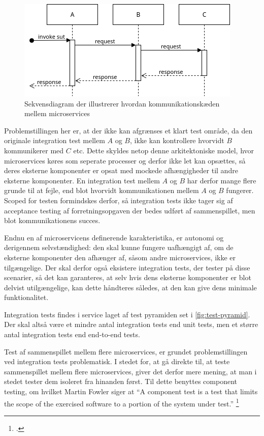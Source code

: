 \documentclass{article}
\begin{document}
\begin{figure}[H]
    \includegraphics[width=\textwidth]{images/microservice-request-chain.png}
    \caption{Sekvensdiagram der illustrerer hvordan kommunikationskæden mellem microservices}
    \label{fig:microservice-request-chain}
\end{figure}

Problemstillingen her er, at der ikke kan afgrænses et klart test område, da den originale integration test mellem $A$ og $B$, ikke kan kontrollere hvorvidt $B$ kommunikerer med $C$ etc. Dette skyldes netop denne arkitektoniske model, hvor microservices køres som seperate processer og derfor ikke let kan opsættes, så deres eksterne komponenter er opsat med mockede afhængigheder til andre eksterne komponenter. En integration test mellem $A$ og $B$ har derfor mange flere grunde til at fejle, end blot hvorvidt kommunikationen mellem $A$ og $B$ fungerer. Scoped for testen formindskes derfor, så integration tests ikke tager sig af acceptance testing af forretningsopgaven der bedes udført af sammenspillet, men blot kommunikationens succes.

Endnu en af microservicens definerende karakteristika, er autonomi og derigennem selvstændighed: den skal kunne fungere uafhængigt af, om de eksterne komponenter den afhænger af, såsom andre microservices, ikke er tilgængelige. Der skal derfor også eksistere integration tests, der tester på disse scenarier, så det kan garanteres, at selv hvis dens eksterne komponenter er blot delvist utilgængelige, kan dette håndteres således, at den kan give dens minimale funktionalitet.

Integration tests findes i service laget af test pyramiden set i \cref{fig:test-pyramid}. Der skal altså være et mindre antal integration tests end unit tests, men et større antal integration tests end end-to-end tests.

Test af sammenspillet mellem flere microservices, er grundet problemstillingen ved integration tests problematisk. I stedet for, at gå direkte til, at teste sammenspillet mellem flere microservices, giver det derfor mere mening, at man i stedet tester dem isoleret fra hinanden først. Til dette benyttes component testing, om hvilket Martin Fowler siger at ``A component test is a test that limits the scope of the exercised software to a portion of the system under test.'' \footcite{fowler:component-test}
\end{document}
